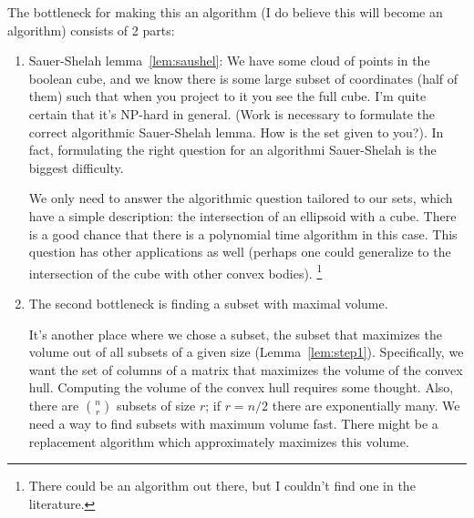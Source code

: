The bottleneck for making this an algorithm (I do believe this will become an algorithm) consists of 2 parts:
\begin{enumerate}
\item
Sauer-Shelah lemma~\ref{lem:saushel}: We have some cloud of points in the boolean cube, and we know there is some large subset of coordinates (half of them) such that when you project to it you see the full cube. I'm quite certain that it's NP-hard in general. (Work is necessary to formulate the correct algorithmic Sauer-Shelah lemma. How is the set given to you?). In fact, formulating the right question for an algorithmi Sauer-Shelah is the biggest difficulty. 

We only need to answer the algorithmic question tailored to our sets, which have a simple description: the intersection of an ellipsoid with a cube. There is a good chance that there is a polynomial time algorithm in this case. This question has other applications as well (perhaps one could generalize to the intersection of the cube with other convex bodies).
\footnote{There could be an algorithm out there, but I couldn't find one in the literature.}
\item
The second bottleneck is finding a subset with maximal volume. 

It's another place where we chose a subset, the subset that maximizes the volume out of all subsets of a given size (Lemma~\ref{lem:step1}). Specifically, we want the set of columns of a matrix that maximizes the volume of the convex hull.
Computing the volume of the convex hull requires some thought.
Also, there are $\binom nr$ subsets of size $r$; if $r=n/2$ there are exponentially many. We need a way to find subsets with maximum volume fast. There might be a replacement algorithm which approximately maximizes this volume.
\end{enumerate}

